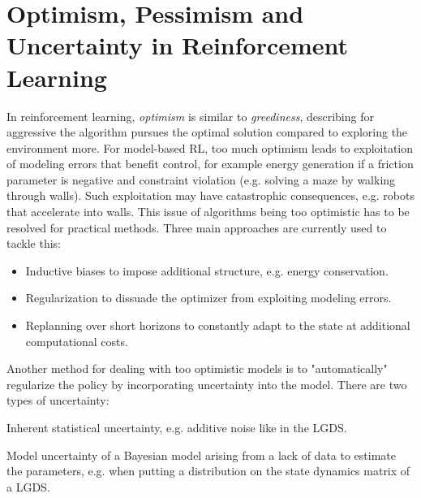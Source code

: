	\section{Optimism, Pessimism and Uncertainty in Reinforcement Learning}
		\label{sec:mbrlBayesian}

		In reinforcement learning, \emph{optimism} is similar to \emph{greediness}, describing for aggressive the algorithm pursues the optimal solution compared to exploring the environment more. For model-based RL, too much optimism leads to exploitation of modeling errors that benefit control, for example energy generation if a friction parameter is negative and constraint violation (e.g. solving a maze by walking through walls). Such exploitation may have catastrophic consequences, e.g. robots that accelerate into walls. This issue of algorithms being too optimistic has to be resolved for practical methods. Three main approaches are currently used to tackle this:
		\begin{itemize}
			\item Inductive biases to impose additional structure, e.g. energy conservation.
			\item Regularization to dissuade the optimizer from exploiting modeling errors.
			\item Replanning over short horizons to constantly adapt to the state at additional computational costs.
		\end{itemize}
		Another method for dealing with too optimistic models is to "automatically" regularize the policy by incorporating uncertainty into the model. There are two types of uncertainty:
		\begin{description}[leftmargin=3cm]
			\item[Aleatoric] Inherent statistical uncertainty, e.g. additive noise like in the LGDS.
			\item[Epistemic] Model uncertainty of a Bayesian model arising from a lack of data to estimate the parameters, e.g. when putting a distribution on the state dynamics matrix of a LGDS.
		\end{description}

